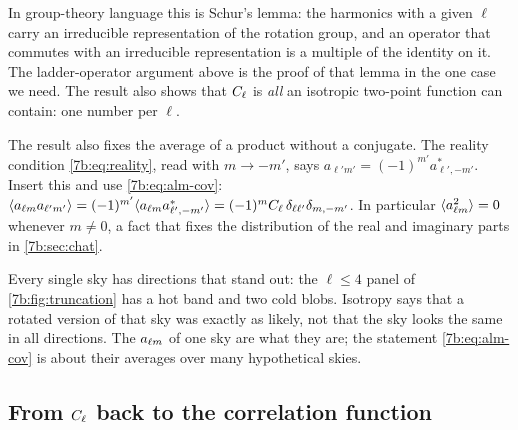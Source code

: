 In group-theory language this is Schur's lemma: the harmonics with a given $\ell$ carry an
irreducible representation of the rotation group, and an operator that commutes with an
irreducible representation is a multiple of the identity on it. The ladder-operator argument
above is the proof of that lemma in the one case we need. The result also shows that $C_\ell$ is
\emph{all} an isotropic two-point function can contain: one number per $\ell$.

The result also fixes the average of a product without a conjugate. The reality condition
\eqref{7b:eq:reality}, read with $m\to-m'$, says $a_{\ell'm'}=(-1)^{m'}a^*_{\ell',-m'}$. Insert this
and use \eqref{7b:eq:alm-cov}: $\langle a_{\ell m} a_{\ell'm'}\rangle=(-1)^{m'}\langle a_{\ell m}
a^*_{\ell',-m'}\rangle=(-1)^mC_\ell\,\delta_{\ell\ell'}\delta_{m,-m'}$. In particular
$\langle a_{\ell m}^2\rangle=0$ whenever $m\neq0$, a fact that fixes the distribution of the real and
imaginary parts in \cref{7b:sec:chat}.

\begin{pitfall}
Every single sky has directions that stand out: the $\ell\le4$ panel of
\cref{7b:fig:truncation} has a hot band and two cold blobs. Isotropy says that a rotated version
of that sky was exactly as likely, not that the sky looks the same in all directions. The
$a_{\ell m}$ of one sky are what they are; the statement \eqref{7b:eq:alm-cov} is about their averages
over many hypothetical skies.
\end{pitfall}

\subsection{From $C_\ell$ back to the correlation function}
\label{7b:sec:ctheta}

